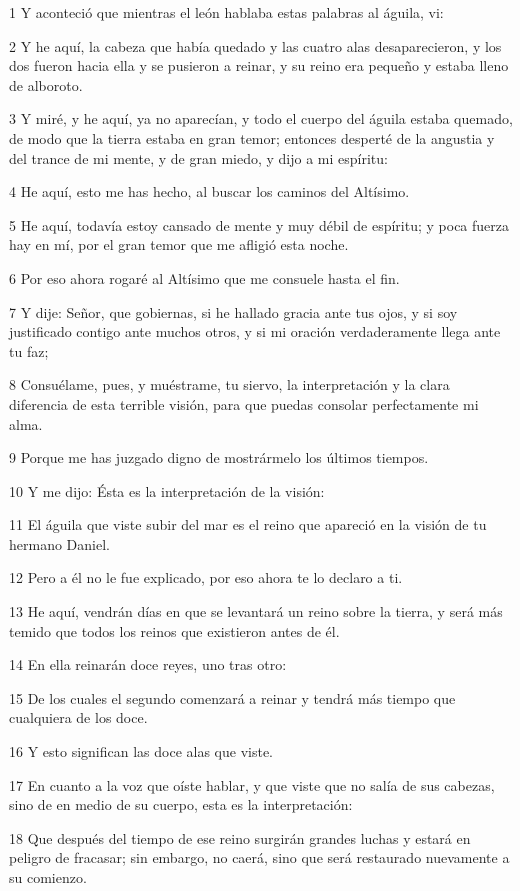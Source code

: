 \par 1 Y aconteció que mientras el león hablaba estas palabras al águila, vi:
\par 2 Y he aquí, la cabeza que había quedado y las cuatro alas desaparecieron, y los dos fueron hacia ella y se pusieron a reinar, y su reino era pequeño y estaba lleno de alboroto.
\par 3 Y miré, y he aquí, ya no aparecían, y todo el cuerpo del águila estaba quemado, de modo que la tierra estaba en gran temor; entonces desperté de la angustia y del trance de mi mente, y de gran miedo, y dijo a mi espíritu:
\par 4 He aquí, esto me has hecho, al buscar los caminos del Altísimo.
\par 5 He aquí, todavía estoy cansado de mente y muy débil de espíritu; y poca fuerza hay en mí, por el gran temor que me afligió esta noche.
\par 6 Por eso ahora rogaré al Altísimo que me consuele hasta el fin.
\par 7 Y dije: Señor, que gobiernas, si he hallado gracia ante tus ojos, y si soy justificado contigo ante muchos otros, y si mi oración verdaderamente llega ante tu faz;
\par 8 Consuélame, pues, y muéstrame, tu siervo, la interpretación y la clara diferencia de esta terrible visión, para que puedas consolar perfectamente mi alma.
\par 9 Porque me has juzgado digno de mostrármelo los últimos tiempos.
\par 10 Y me dijo: Ésta es la interpretación de la visión:
\par 11 El águila que viste subir del mar es el reino que apareció en la visión de tu hermano Daniel.
\par 12 Pero a él no le fue explicado, por eso ahora te lo declaro a ti.
\par 13 He aquí, vendrán días en que se levantará un reino sobre la tierra, y será más temido que todos los reinos que existieron antes de él.
\par 14 En ella reinarán doce reyes, uno tras otro:
\par 15 De los cuales el segundo comenzará a reinar y tendrá más tiempo que cualquiera de los doce.
\par 16 Y esto significan las doce alas que viste.
\par 17 En cuanto a la voz que oíste hablar, y que viste que no salía de sus cabezas, sino de en medio de su cuerpo, esta es la interpretación:
\par 18 Que después del tiempo de ese reino surgirán grandes luchas y estará en peligro de fracasar; sin embargo, no caerá, sino que será restaurado nuevamente a su comienzo.
